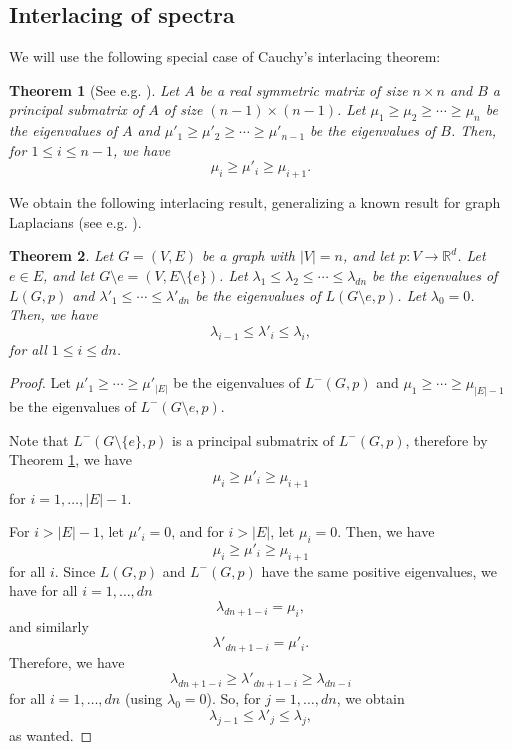 \documentclass[a4paper,11pt]{article}
\theoremstyle{plain}
\newtheorem{theorem}{\bf Theorem}[section]
\theoremstyle{definition}
\newcommand{\Rea}{{\mathbb R}}
\begin{document}
\subsection{Interlacing of spectra}

We will use the following special case of Cauchy's interlacing theorem:
\begin{theorem}[See e.g. \cite{brouwer2011spectra}]\label{thm:cauchy}
Let $A$ be a real symmetric matrix of size $n\times n$ and $B$ a principal submatrix of $A$ of size $(n-1)\times(n-1)$. Let $\mu_1\geq \mu_2\geq  \cdots\geq \mu_n$ be the eigenvalues of $A$ and $\mu'_1\geq\mu'_2\geq \cdots \geq \mu'_{n-1}$ be the eigenvalues of $B$. Then, for $1\leq i\leq n-1$, we have
\[
    \mu_i \geq \mu'_i\geq \mu_{i+1}.
\]
\end{theorem}

We obtain the following interlacing result, generalizing a known result for graph Laplacians (see e.g. \cite[Theorem 13.6.2]{godsil2001algebraic}).

\begin{theorem}\label{thm:edge_removal_interlacing}
Let $G=(V,E)$ be a graph with $|V|=n$, and let $p:V\to \Rea^d$. Let $e\in E$, and let $G\setminus e=(V,E\setminus\{e\})$. Let $\lambda_1\leq \lambda_2\leq \cdots\leq \lambda_{dn}$ be the eigenvalues of $L(G,p)$ and $\lambda'_1\leq \cdots \leq \lambda'_{dn}$ be the eigenvalues of $L(G\setminus e,p)$. Let $\lambda_0=0$. Then, we have
\[
    \lambda_{i-1} \leq \lambda'_{i} \leq \lambda_{i},
\]
for all $1\leq i\leq dn$.
\end{theorem}
\begin{proof}
Let $\mu'_1\geq \cdots\geq \mu'_{|E|}$ be the eigenvalues of $L^{-}(G,p)$ and $\mu_1\geq \cdots\geq \mu_{|E|-1}$ be the eigenvalues of $L^{-}(G\setminus e,p)$. 

 Note that $L^{-}(G\setminus\{e\},p)$ is a principal submatrix of $L^{-}(G,p)$, therefore by Theorem \ref{thm:cauchy}, we have
\[
    \mu_i \geq \mu'_i \geq \mu_{i+1}
\]
for $i=1,\ldots,|E|-1$. 

For $i>|E|-1$, let $\mu'_i=0$, and for $i>|E|$, let $\mu_i=0$. Then, we have
\[
    \mu_i \geq \mu'_i \geq \mu_{i+1}
\]
for all $i$.
Since $L(G,p)$ and $L^{-}(G,p)$ have the same positive eigenvalues, we have for all $i=1,\ldots,d n$
\[
    \lambda_{dn+1-i}=\mu_{i},
\]
and similarly
\[
 \lambda'_{dn+1-i}=\mu'_{i}.
\]
Therefore, we have
\[
    \lambda_{dn+1-i} \geq \lambda'_{dn+1-i} \geq \lambda_{dn-i}
\]
for all $i=1,\ldots,dn$ (using $\lambda_0=0$).
So, for $j=1,\ldots,dn$, we obtain
\[
    \lambda_{j-1} \leq \lambda'_{j} \leq \lambda_{j},
\]
as wanted.
\end{proof}
\end{document}
